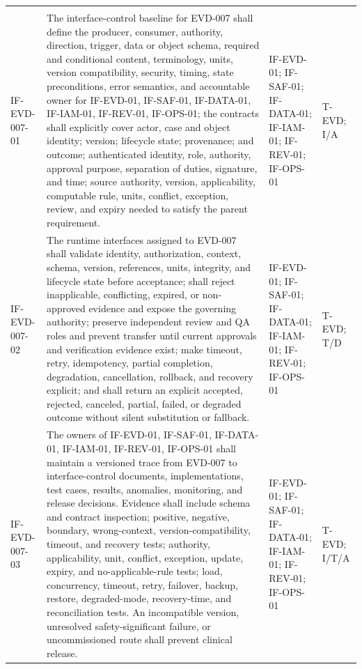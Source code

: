 \documentclass[11pt,letterpaper]{article}
\begin{document}
\begin{scriptsize}
\begin{longtable}{@{}L{0.14\textwidth}L{0.49\textwidth}L{0.19\textwidth}L{0.10\textwidth}@{}}
\addlinespace[2pt]
 \\
\addlinespace[2pt]
\mbox{IF-EVD-007-01} & The interface-control baseline for EVD-007 shall define the producer, consumer, authority, direction, trigger, data or object schema, required and conditional content, terminology, units, version compatibility, security, timing, state preconditions, error semantics, and accountable owner for IF-EVD-01, IF-SAF-01, IF-DATA-01, IF-IAM-01, IF-REV-01, IF-OPS-01; the contracts shall explicitly cover actor, case and object identity; version; lifecycle state; provenance; and outcome; authenticated identity, role, authority, approval purpose, separation of duties, signature, and time; source authority, version, applicability, computable rule, units, conflict, exception, review, and expiry needed to satisfy the parent requirement. & IF-EVD-01; IF-SAF-01; IF-DATA-01; IF-IAM-01; IF-REV-01; IF-OPS-01 & T-EVD; I\slash\allowbreak{}A \\
\addlinespace[2pt]
\mbox{IF-EVD-007-02} & The runtime interfaces assigned to EVD-007 shall validate identity, authorization, context, schema, version, references, units, integrity, and lifecycle state before acceptance; shall reject inapplicable, conflicting, expired, or non-approved evidence and expose the governing authority; preserve independent review and QA roles and prevent transfer until current approvals and verification evidence exist; make timeout, retry, idempotency, partial completion, degradation, cancellation, rollback, and recovery explicit; and shall return an explicit accepted, rejected, canceled, partial, failed, or degraded outcome without silent substitution or fallback. & IF-EVD-01; IF-SAF-01; IF-DATA-01; IF-IAM-01; IF-REV-01; IF-OPS-01 & T-EVD; T\slash\allowbreak{}D \\
\addlinespace[2pt]
\mbox{IF-EVD-007-03} & The owners of IF-EVD-01, IF-SAF-01, IF-DATA-01, IF-IAM-01, IF-REV-01, IF-OPS-01 shall maintain a versioned trace from EVD-007 to interface-control documents, implementations, test cases, results, anomalies, monitoring, and release decisions. Evidence shall include schema and contract inspection; positive, negative, boundary, wrong-context, version-compatibility, timeout, and recovery tests; authority, applicability, unit, conflict, exception, update, expiry, and no-applicable-rule tests; load, concurrency, timeout, retry, failover, backup, restore, degraded-mode, recovery-time, and reconciliation tests. An incompatible version, unresolved safety-significant failure, or uncommissioned route shall prevent clinical release. & IF-EVD-01; IF-SAF-01; IF-DATA-01; IF-IAM-01; IF-REV-01; IF-OPS-01 & T-EVD; I\slash\allowbreak{}T\slash\allowbreak{}A \\

\end{longtable}
\end{scriptsize}
\end{document}
